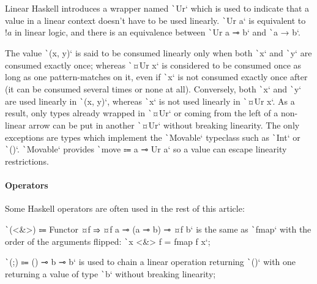 \documentclass[english]{jflart}
\begin{document}
Linear Haskell introduces a wrapper named \texttt`Ur` which is used to indicate that a value in a linear context doesn't have to be used linearly. \texttt`Ur a` is equivalent to $!a$ in linear logic, and there is an equivalence between \texttt`Ur a ⊸ b` and \texttt`a → b`.

The value \texttt`(x, y)` is said to be consumed linearly only when both \texttt`x` and \texttt`y` are consumed exactly once; whereas \texttt`¤Ur x` is considered to be consumed once as long as one pattern-matches on it, even if \texttt`x` is not consumed exactly once after (it can be consumed several times or none at all). Conversely, both \texttt`x` and \texttt`y` are used linearly in \texttt`(x, y)`, whereas \texttt`x` is not used linearly in \texttt`¤Ur x`. As a result, only types already wrapped in \texttt`¤Ur` or coming from the left of a non-linear arrow can be put in another \texttt`¤Ur` without breaking linearity. The only exceptions are types which implement the \texttt`Movable` typeclass such as \texttt`Int` or \texttt`()`. \texttt`Movable` provides \texttt`move ⩴ a ⊸ Ur a` so a value can escape linearity restrictions.


\paragraph{Operators}

Some Haskell operators are often used in the rest of this article:

\texttt`(<&>) ⩴ Functor ¤f ⇒ ¤f a ⊸ (a ⊸ b) ⊸ ¤f b` is the same as \texttt`fmap` with the order of the arguments flipped: \texttt`x <&> f = fmap f x`;%

\texttt`(;) ⩴ () ⊸ b ⊸ b` is used to chain a linear operation returning \texttt`()` with one returning a value of type \texttt`b` without breaking linearity;
\end{document}
